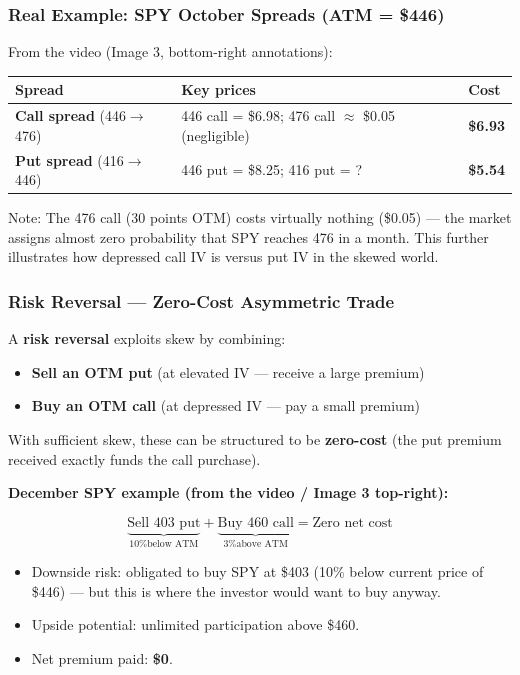 \documentclass[12pt,openany]{book}
\begin{document}
\subsubsection{Real Example: SPY October Spreads (ATM = \$446)}

From the video (Image 3, bottom-right annotations):

\begin{center}
\scriptsize
\setlength{\tabcolsep}{3pt}
\begin{tabular}{|L{4.1cm}|L{4.1cm}|L{4.1cm}|}
\hline
\textbf{Spread} & \textbf{Key prices} & \textbf{Cost} \\
\hline
\textbf{Call spread} (446\(\rightarrow\)476) & 446 call = \$6.98; 476 call \(\approx\) \$0.05 (negligible) & \textbf{\$6.93} \\
\hline
\textbf{Put spread} (416\(\rightarrow\)446) & 446 put = \$8.25; 416 put = ? & \textbf{\$5.54} \\
\hline
\end{tabular}
\end{center}

Note: The 476 call (30 points OTM) costs virtually nothing (\$0.05) — the market assigns almost zero probability that SPY reaches 476 in a month. This further illustrates how depressed call IV is versus put IV in the skewed world.

\subsubsection{Risk Reversal — Zero-Cost Asymmetric Trade}

A \textbf{risk reversal} exploits skew by combining:
\begin{itemize}[leftmargin=*]
    \item \textbf{Sell an OTM put} (at elevated IV — receive a large premium)
    \item \textbf{Buy an OTM call} (at depressed IV — pay a small premium)
\end{itemize}

With sufficient skew, these can be structured to be \textbf{zero-cost} (the put premium received exactly funds the call purchase).

\textbf{December SPY example (from the video / Image 3 top-right):}

\[
\underbrace{\text{Sell 403 put}}_{\text{10\% below ATM}} + \underbrace{\text{Buy 460 call}}_{\text{3\% above ATM}} = \text{Zero net cost}
\]

\begin{itemize}[leftmargin=*]
    \item Downside risk: obligated to buy SPY at \$403 (10\% below current price of \$446) — but this is where the investor would want to buy anyway.
    \item Upside potential: unlimited participation above \$460.
    \item Net premium paid: \textbf{\$0}.
\end{itemize}
\end{document}
